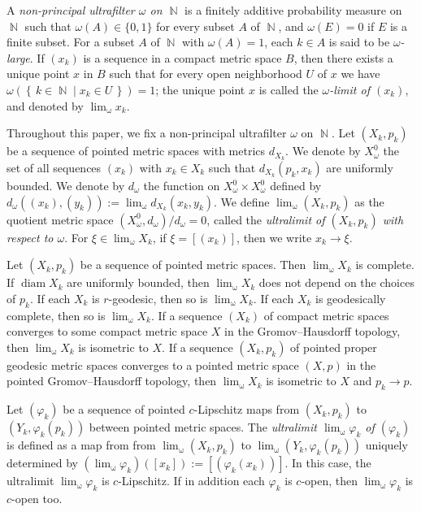 \documentclass[a4paper,12pt]{amsart}
\newcommand{\diam}{\operatorname{diam}}
\newcommand{\ulim}{\operatorname{\lim_{\omega}}}
\newcommand{\N}{\operatorname{\mathbb{N}}}
\numberwithin{equation}{section}
\theoremstyle{plain}
\theoremstyle{definition}
\theoremstyle{remark}
\begin{document}
A \emph{non-principal ultrafilter $\omega$ on $\N$}
is a finitely additive probability measure on $\N$ such that
$\omega(A) \in \{0,1\}$ for every subset $A$ of $\N$,
and $\omega(E) = 0$ if $E$ is a finite subset.
For a subset $A$ of $\N$ with $\omega(A) = 1$,
each $k \in A$ is said to be \emph{$\omega$-large}.
If $(x_k)$ is a sequence in a compact metric space $B$,
then there exists a unique point $x$ in $B$ such that
for every open neighborhood $U$ of $x$
we have 
$\omega \left( \left\{ \, k \in \N \mid x_k \in U \, \right\} \right) = 1$;
the unique point $x$ is called the \emph{$\omega$-limit of $(x_k)$},
and denoted by $\ulim x_k$.

Throughout this paper,
we fix a non-principal ultrafilter $\omega$ on $\N$.
Let $(X_k,p_k)$ be a sequence of pointed metric spaces
with metrics $d_{X_k}$.
We denote by $X_{\omega}^0$
the set of all sequences $(x_k)$
with $x_k \in X_k$ 
such that
$d_{X_k}(p_k,x_k)$ are uniformly bounded.
We denote by 
$d_{\omega}$ the function on 
$X_{\omega}^0 \times X_{\omega}^0$
defined by
$d_{\omega}((x_k),(y_k)) := \ulim d_{X_k}(x_k,y_k)$.
We define 
$\ulim (X_k,p_k)$ as the quotient
metric space $(X_{\omega}^0,d_{\omega}) / d_{\omega}=0$,
called the \emph{ultralimit of $(X_k,p_k)$ 
with respect to $\omega$}.
For $\xi \in \ulim X_k$,
if $\xi = [(x_k)]$,
then we write $x_k \to \xi$.

Let $(X_k,p_k)$ be a sequence of pointed metric spaces.
Then $\ulim X_k$ is complete.
If $\diam X_k$ are uniformly bounded,
then $\ulim X_k$ does not depend on the choices of
$p_k$.
If each $X_k$ is $r$-geodesic,
then so is $\ulim X_k$.
If each $X_k$ is geodesically complete,
then so is $\ulim X_k$.
If a sequence $(X_k)$ of compact metric spaces 
converges to some compact metric space $X$ 
in the Gromov--Hausdorff topology,
then $\ulim X_k$ is isometric to $X$.
If a sequence $(X_k,p_k)$ of pointed proper geodesic metric spaces 
converges to a pointed metric space $(X,p)$
in the pointed Gromov--Hausdorff topology,
then $\ulim X_k$ is isometric to $X$ and 
$p_k \to p$.

Let $(\varphi_k)$ be a sequence of pointed $c$-Lipschitz maps
from $(X_k,p_k)$ to $(Y_k,\varphi_k(p_k))$
between pointed metric spaces.
The \emph{ultralimit $\ulim \varphi_k$ of $(\varphi_k)$}
is defined as a map from 
from $\ulim (X_k,p_k)$ to $\ulim (Y_k,\varphi_k(p_k))$
uniquely determined by
$\left( \ulim \varphi_k \right) \left( [x_k] \right)
:= \left[ \left( \varphi_k(x_k) \right) \right]$.
In this case,
the ultralimit $\ulim \varphi_k$ is $c$-Lipschitz.
If in addition each $\varphi_k$ is $c$-open,
then $\ulim \varphi_k$ is $c$-open too.
\end{document}
